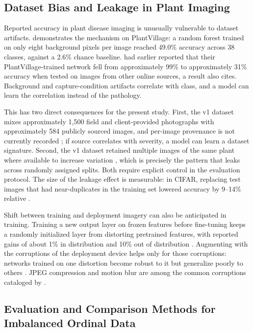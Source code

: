\documentclass{icsthesis}
\begin{document}
\begin{mainmatter}
			\subsection{Dataset Bias and Leakage in Plant Imaging}\label{sec:leakage}

				Reported accuracy in plant disease imaging is unusually vulnerable to dataset
				artifacts. \citet{noyan2022} demonstrates the mechanism on PlantVillage: a random
				forest trained on only eight background pixels per image reached 49.0\% accuracy
				across 38 classes, against a 2.6\% chance baseline. \citet{mohanty2016} had earlier
				reported that their PlantVillage-trained network fell from approximately 99\% to
				approximately 31\% accuracy when tested on images from other online sources, a
				result \citet{noyan2022} also cites. Background and capture-condition artifacts
				correlate with class, and a model can learn the correlation instead of the
				pathology.

				This has two direct consequences for the present study. First, the v1 dataset mixes
				approximately 1,500 field and client-provided photographs with approximately 584
				publicly sourced images, and per-image provenance is not currently recorded
				\citep{casasola2026}; if source correlates with severity, a model can learn a
				dataset signature. Second, the v1 dataset retained multiple images of the same plant
				where available to increase variation \citep{casasola2026}, which is precisely the
				pattern that leaks across randomly assigned splits. Both require explicit control in the evaluation protocol. The size of the leakage effect is measurable: in CIFAR, replacing test images that had near-duplicates in the training set lowered accuracy by 9--14\% relative \citep{barz2020}.

Shift between training and deployment imagery can also be anticipated in training. Training a new output layer on frozen features before fine-tuning keeps a randomly initialized layer from distorting pretrained features, with reported gains of about 1\% in distribution and 10\% out of distribution \citep{kumar2022}. Augmenting with the corruptions of the deployment device helps only for those corruptions: networks trained on one distortion become robust to it but generalize poorly to others \citep{geirhos2018}. JPEG compression and motion blur are among the common corruptions cataloged by \citet{hendrycks2019}.

			\subsection{Evaluation and Comparison Methods for Imbalanced Ordinal
			Data}\label{sec:evalmethods}


\end{mainmatter}
\end{document}
